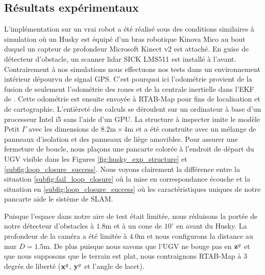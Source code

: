 \subsection{Résultats expérimentaux}

L'implémentation sur un vrai robot a été réalisé sous des conditions similaires à simulation où un Husky est équipé d'un bras robotique Kinova Mico au bout duquel un capteur de profondeur Microsoft Kinect v2 est attaché. En guise de détecteur d'obstacle, un scanner lidar SICK LMS511 est installé à l'avant. Contrairement à nos simulations nous effectuons nos tests dans un environnement intérieur dépourvu de signal GPS. C'est pourquoi ici l'odométrie provient de la fusion de seulement l'odométrie des roues et de la centrale inertielle dans l'EKF de \citep{MooreEkf2014}. Cette odométrie est ensuite envoyée à RTAB-Map \citep{Labbe2014} pour fins de localisation et de cartographie. L'entièreté des calculs se déroulent sur un ordinateur à base d'un processeur Intel i5 sans l'aide d'un GPU. La structure à inspecter imite le modèle Petit $\Gamma$ avec les dimensions de $8.2\text{m} \times 4\text{m}$ et a été construite avec un mélange de panneaux d'isolation et des panneaux de liège amovibles. Pour assurer une fermeture de boucle, nous plaçons une pancarte colorée à l'endroit de départ du UGV visible dans les Figures \ref{fig:husky_exp_structure} et \ref{subfig:loop_closure_success}. Nous voyons clairement la différence entre la situation \ref{subfig:fail_loop_closure} où la mise en correspondance écouche et la situation en \ref{subfig:loop_closure_success} où les caractéristiques uniques de notre pancarte aide le sistème de SLAM.

Puisque l'espace dans notre aire de test était limitée, nous réduisons la portée de notre détecteur d'obstacles à $1.8$m et à un cone de $10^\circ$  en avant du Husky. La profondeur de la caméra a été limitée à $4.0$m et nous configurons la distance au mur $D=1.5$m. De plus puisque nous savons que l'UGV ne bouge pas en $\mathbf{z}^g$ et que nous supposons que le terrain est plat, nous contraignons RTAB-Map à $3$ degrés de liberté ($\mathbf{x}^g$, $\mathbf{y}^g$ et l'angle de lacet).

